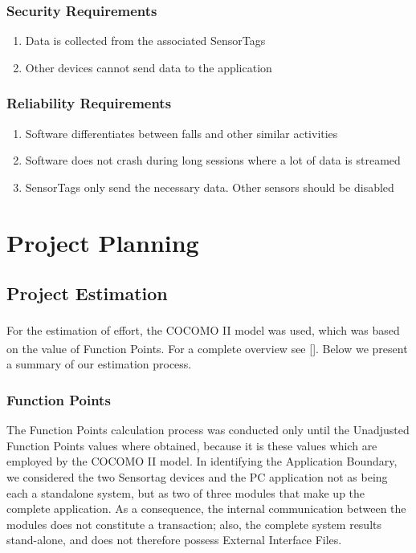 \documentclass[hidelinks,conference,12pt]{IEEETran}
\begin{document}
\subsubsection{Security Requirements}

\begin{enumerate}
	\item Data is collected from the associated SensorTags
	\item Other devices cannot send data to the application
\end{enumerate}

\subsubsection{Reliability Requirements}

\begin{enumerate}
	\item Software differentiates between falls and other similar activities
	\item Software does not crash during long sessions where a lot of data is streamed
	\item SensorTags only send the necessary data. Other sensors should be disabled
\end{enumerate}

\section{Project Planning}

\subsection{Project Estimation}
For the estimation of effort, the COCOMO II model was used\textsuperscript{\cite{cocomo}}, which was based on the value of Function Points\textsuperscript{\cite{albrecht}}. For a complete overview see []. Below we present a summary of our estimation process.

\subsubsection{Function Points}
The Function Points calculation process was conducted only until the Unadjusted Function Points values where obtained, because it is these values which are employed by the COCOMO II model.
In identifying the Application Boundary, we considered the two Sensortag devices and the PC application not as being each a standalone system, but as two of three modules that make up the complete application. As a consequence, the internal communication between the modules does not constitute a transaction; also, the complete system results stand-alone, and does not therefore possess External Interface Files.
\end{document}
